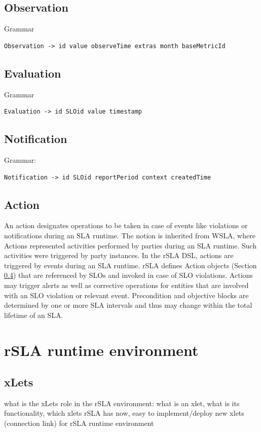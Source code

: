 \documentclass{llncs}
\begin{document}
 
\subsection{Observation}\label{observation}
Grammar
\begin{verbatim}
Observation -> id value observeTime extras month baseMetricId
\end{verbatim}

\subsection{Evaluation}\label{eval}
Grammar
\begin{verbatim}
Evaluation -> id SLOid value timestamp
\end{verbatim}

\subsection{Notification}\label{notif}
Grammar:
\begin{verbatim}
Notification -> id SLOid reportPeriod context createdTime
\end{verbatim}

\subsection{Action}\label{action}

An action designates operations to be taken in case of events like violations or notifications during an SLA runtime. The notion is inherited from WSLA, where
Actions represented activities performed by parties during an SLA runtime. Such activities were triggered by party instances. In the rSLA DSL, actions are triggered by events during an SLA runtime.  
rSLA defines Action objects (Section \ref{action}) that are referenced by SLOs and invoked in case of SLO violations. Actions may trigger alerts as well as corrective operations for entities that are involved with an SLO violation or relevant event. Precondition and objective blocks are determined by one or more SLA intervals and thus may change within the total lifetime of an SLA.

\section{rSLA runtime environment}

\subsection{xLets}
what is the xLets role in the rSLA environment: what is an xlet, what is its functionality, which xlets rSLA has now, easy to implement/deploy new xlets (connection link) for rSLA runtime environment
\end{document}

